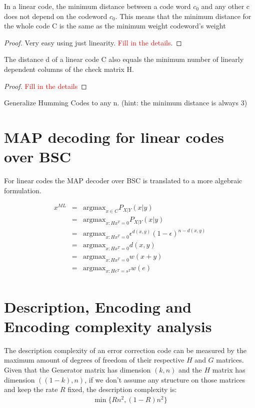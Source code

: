 \begin{theorem}
	In a linear code, the minimum distance between a code word $c_0$  and any other c does not depend on the codeword $c_0$. This means that the minimum distance for the whole code C is the same as the minimum weight codeword's weight 
\end{theorem}
\begin{proof}
	Very easy using just linearity. \textcolor{red}{Fill in the details}. 
\end{proof}

\begin{theorem}
The distance d of a linear code C also equals the minimum number of linearly dependent columns of the check matrix H.
\end{theorem}
\begin{proof}
	\textcolor{red}{Fill in the details}
\end{proof}

\begin{example}[Exercise]	
	Generalize Humming Codes to any n. (hint: the minimum distance is always 3)
\end{example}

\section{MAP decoding for linear codes over BSC}

For linear codes the MAP decoder over BSC is translated to a more algebraic formulation.

\begin{eqnarray}
	x^{ML} &=& \text{argmax}_{x \in C} P_{X|Y}(x|y) \\
	&=& \text{argmax}_{x: Hx^T=0} P_{X|Y}(x|y) \\
	&=& \text{argmax}_{x: Hx^T=0} \epsilon^{d(x,y)}(1-\epsilon)^{n-d(x,y)} \\
	&=& \text{argmax}_{x: Hx^T=0} d(x, y) \\
	&=& \text{argmax}_{x: Hx^T=0} w(x + y) \\
	&=& \text{argmax}_{x: He^T=s^T} w(e) \\
\end{eqnarray}
\section{Description, Encoding and Encoding complexity analysis}
The description complexity of an error correction code can be measured by the maximum amount of degrees of freedom of their respective $H$ and $G$ matrices.
Given that the Generator matrix has dimension $(k, n)$ and the $H$ matrix has dimension $((1-k), n)$, if we don't assume any structure on those matrices and keep the rate $R$ fixed, the description complexity is:
\begin{eqnarray}
	\min\{Rn^2, (1-R)n^2\}
\end{eqnarray}

